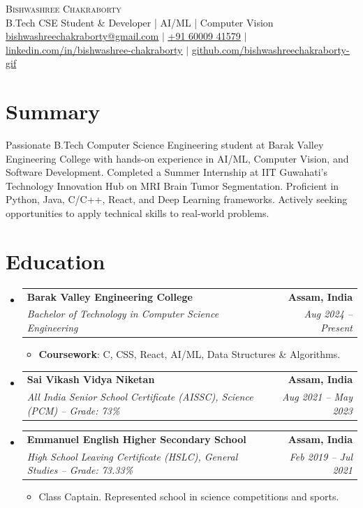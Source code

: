 \documentclass[letterpaper,11pt]{article}
\makeatletter
\newcommand{\resumeItem}[1]{
  \item\small{
    {#1 \vspace{-2pt}}
  }
}
\newcommand{\resumeSubheading}[4]{
  \vspace{-2pt}\item
    \begin{tabular*}{1.0\textwidth}[t]{l@{\extracolsep{\fill}}r}
      \textbf{#1} & \textbf{\small #2} \\
      \textit{\small#3} & \textit{\small #4} \\
    \end{tabular*}\vspace{-7pt}
}
\newcommand{\resumeSubHeadingListStart}{\begin{itemize}[leftmargin=0.0in, label={}]}
\newcommand{\resumeSubHeadingListEnd}{\end{itemize}}
\newcommand{\resumeItemListStart}{\begin{itemize}}
\newcommand{\resumeItemListEnd}{\end{itemize}\vspace{-5pt}}
\makeatother
\begin{document}
\begin{center}
    {\Huge \scshape Bishwashree Chakraborty} \\ \vspace{1pt}
    B.Tech CSE Student \& Developer | AI/ML | Computer Vision \\ \vspace{1pt}
    \small \href{mailto:bishwashreechakraborty@gmail.com}{\underline{bishwashreechakraborty@gmail.com}} $|$ 
    \href{tel:+916000941579}{\underline{+91 60009 41579}} $|$ 
    \href{https://linkedin.com/in/bishwashree-chakraborty-205621327}{\underline{linkedin.com/in/bishwashree-chakraborty}} $|$
    \href{https://github.com/bishwashreechakraborty-gif}{\underline{github.com/bishwashreechakraborty-gif}}
\end{center}


\section{Summary}
\small{Passionate B.Tech Computer Science Engineering student at Barak Valley Engineering College with hands-on experience in AI/ML, Computer Vision, and Software Development. Completed a Summer Internship at IIT Guwahati's Technology Innovation Hub on MRI Brain Tumor Segmentation. Proficient in Python, Java, C/C++, React, and Deep Learning frameworks. Actively seeking opportunities to apply technical skills to real-world problems.}


\section{Education}
  \resumeSubHeadingListStart
    \resumeSubheading
      {Barak Valley Engineering College}{Assam, India}
      {Bachelor of Technology in Computer Science Engineering}{Aug 2024 -- Present}
      \resumeItemListStart
        \resumeItem{\textbf{Coursework}: C, CSS, React, AI/ML, Data Structures \& Algorithms.}
      \resumeItemListEnd
    \resumeSubheading
      {Sai Vikash Vidya Niketan}{Assam, India}
      {All India Senior School Certificate (AISSC), Science (PCM) -- Grade: 73\%}{Aug 2021 -- May 2023}
    \resumeSubheading
      {Emmanuel English Higher Secondary School}{Assam, India}
      {High School Leaving Certificate (HSLC), General Studies -- Grade: 73.33\%}{Feb 2019 -- Jul 2021}
      \resumeItemListStart
        \resumeItem{Class Captain. Represented school in science competitions and sports.}
      \resumeItemListEnd
  \resumeSubHeadingListEnd
\end{document}
